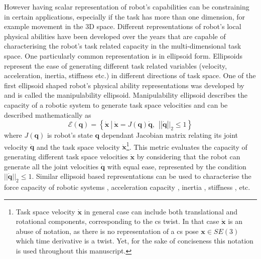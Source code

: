 However having scalar representation of robot's capabilities can be constraining in certain applications, especially if the task has more than one dimension, for example movement in the 3D space. Different representations of robot's local physical abilities have been developed over the years that are capable of characterising the robot's task related capacity in the multi-dimensional task space. One particularly common representation is in ellipsoid form. Ellipsoids represent the ease of generating different task related variables (velocity, acceleration, inertia, stiffness etc.) in different directions of task space. One of the first ellipsoid shaped robot's physical ability representations was developed by \citet{yoshikawa1985manipulability} and is called the manipulability ellipsoid. Manipulability ellipsoid describes the capacity of a robotic system to generate task space velocities and can be described mathematically as
\begin{equation}
    \mathcal{E}(\bm{q}) = \left\{ \dot{\bm{x}} ~|~ \dot{\bm{x}} = J(\bm{q})\dot{\bm{q}},~~ ||\dot{\bm{q}}||_2 \leq 1 \right\}
\end{equation}
where $J(\bm{q})$ is robot's state $\bm{q}$ dependant Jacobian matrix relating its joint velocity $\dot{\bm{q}}$ and the task space velocity $\dot{\bm{x}}$\footnote{Task space velocity $\dot{\bm{x}}$ in general case can include both translational and rotational components, corresponding to the \gls{cs} twist. In that case $\dot{\bm{x}}$ is an abuse of notation, as there is no representation of a \gls{cs} pose $\bm{x} \in SE(3)$ which time derivative is a twist. Yet, for the sake of conciseness this notation is used throughout this manuscript.}. This metric evaluates the capacity of generating different task space velocities $\dot{\bm{x}}$ by considering that the robot can generate all the joint velocities $\dot{\bm{q}}$ with equal ease, represented by the condition $||\dot{\bm{q}}||_2 \leq 1$. Similar ellipsoid based representations can be used to characterise the force capacity of robotic systems \cite{chiacchio_global_1991}, acceleration capacity \cite{yoshikawa1985dynamic}, inertia \cite{Asada1984}, stiffness \cite{ajoudani2015role}, etc. 

